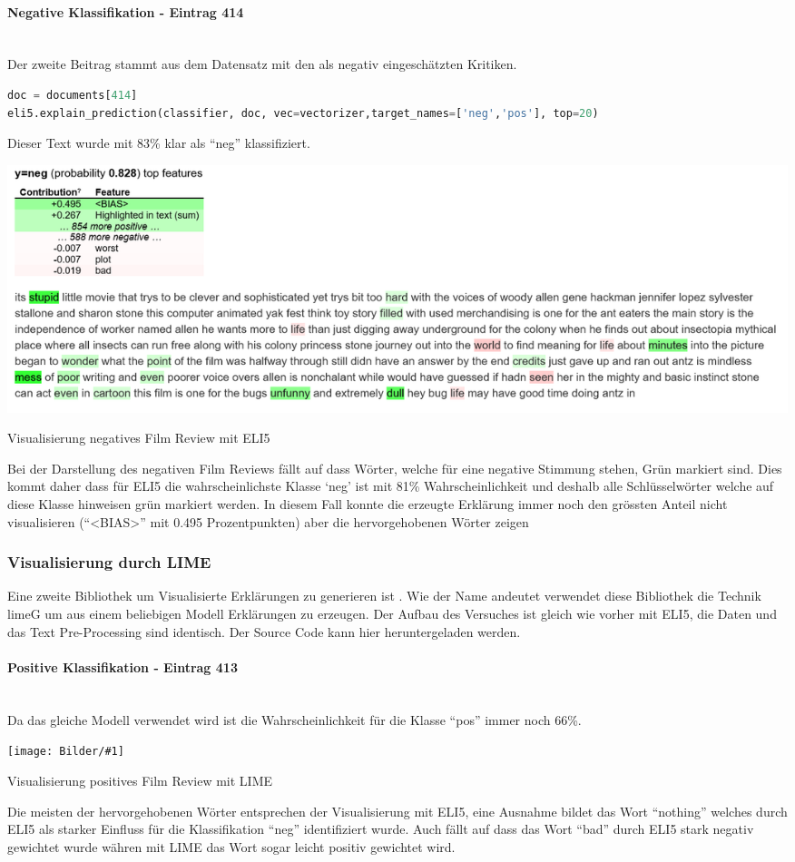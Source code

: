 \documentclass[
  12pt, %
  a4paper, %
  oneside, %
  openany, 
  numbers=noenddot, %
  BCOR=5mm, %
  parskip=half*, %
  thesis, %
]{bfhbook}
\newcommand{\parag}[1]{\paragraph*{#1}\mbox{}\\}
\newcommand{\imgText}[3]{
\begin{center}
    \begin{minipage}[t]{0.6\textwidth}
    		\vspace{0pt}
		\texttt{[image: Bilder/\#1]}
		\caption{#2}
	\end{minipage}\hfill
    \begin{minipage}[t]{0.4\textwidth}
    		\vspace{5pt}
  		#3
    \end{minipage}
\end{center}
}
\begin{document}
\parag{Negative Klassifikation - Eintrag 414}
Der zweite Beitrag stammt aus dem Datensatz mit den als negativ eingeschätzten Kritiken.
\begin{lstlisting}[language=Python]
doc = documents[414]
eli5.explain_prediction(classifier, doc, vec=vectorizer,target_names=['neg','pos'], top=20)
\end{lstlisting}
\label{eli5414}
Dieser Text wurde mit 83\% klar als ``neg'' klassifiziert.
\begin{center}
\begin{minipage}[t]{\linewidth}

\includegraphics[width=\textwidth]{Bilder/MovieReviews-SentimentClassification_ELI5-414.PNG}

\caption{Visualisierung negatives Film Review mit ELI5}
\end{minipage}
\end{center}
Bei der Darstellung des negativen Film Reviews fällt auf dass Wörter, welche für eine negative Stimmung stehen, Grün markiert sind. Dies kommt daher dass für ELI5 die wahrscheinlichste Klasse `neg' ist mit 81\% Wahrscheinlichkeit und deshalb alle Schlüsselwörter welche auf diese Klasse hinweisen grün markiert werden. In diesem Fall konnte die erzeugte Erklärung immer noch den grössten Anteil nicht visualisieren (``<BIAS>'' mit 0.495 Prozentpunkten) aber die hervorgehobenen Wörter zeigen 

\subsubsection*{Visualisierung durch LIME}
Eine zweite Bibliothek um Visualisierte Erklärungen zu generieren ist \parencite{lime}. Wie der Name andeutet verwendet diese Bibliothek die Technik \Gls{limeG} um aus einem beliebigen Modell Erklärungen zu erzeugen. Der Aufbau des Versuches ist gleich wie vorher mit ELI5, die Daten und das Text Pre-Processing sind identisch. Der Source Code kann hier \cite{textClassLime} heruntergeladen werden.

\parag{Positive Klassifikation - Eintrag 413}
Da das gleiche Modell verwendet wird ist die Wahrscheinlichkeit für die Klasse ``pos'' immer noch 66\%.
\imgText{MovieReview-RandomForest-Display-413.PNG}{Visualisierung positives Film Review mit LIME}{
Die meisten der hervorgehobenen Wörter entsprechen der Visualisierung mit ELI5, eine Ausnahme bildet das Wort ``nothing'' welches durch ELI5 als starker Einfluss für die Klassifikation ``neg'' identifiziert wurde. Auch fällt auf dass das Wort ``bad'' durch ELI5 stark negativ gewichtet wurde währen mit LIME das Wort sogar leicht positiv gewichtet wird.
}
\end{document}
